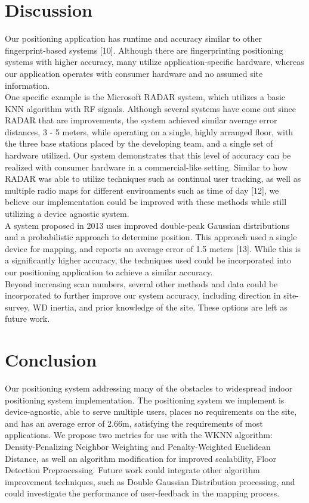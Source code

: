\documentclass[conference]{IEEEtran}
\begin{document}
\section{Discussion}
\indent Our positioning application has runtime and accuracy similar to other fingerprint-based systems [10]. Although there are fingerprinting positioning systems with higher accuracy, many utilize application-specific hardware, whereas our application operates with  consumer hardware and no assumed site information.\\
\indent One specific example is the Microsoft RADAR system, which utilizes a basic KNN algorithm with RF signals. Although several systems have come out since RADAR that are improvements, the system achieved similar average error distances, 3 - 5 meters, while operating on a single, highly arranged floor, with the three base stations placed by the developing team, and a single set of hardware utilized. Our system demonstrates that this level of accuracy can be realized with consumer hardware in a commercial-like setting. Similar to how RADAR was able to utilize techniques such as continual user tracking, as well as multiple radio maps for different environments such as time of day [12], we believe our implementation could be improved with these methods while still utilizing a device agnostic system.\\
\indent A system proposed in 2013 uses improved double-peak Gaussian distributions and a probabilistic approach to determine position. This approach used a single device for mapping, and reports an average error of 1.5 meters [13]. While this is a significantly higher accuracy, the techniques used could be incorporated into our positioning application to achieve a similar accuracy.\\ 
\indent Beyond increasing scan numbers, several other methods and data could be incorporated to further improve our system accuracy, including direction in site-survey, WD inertia, and prior knowledge of the site. These options are left as future work.



\section{Conclusion}
Our positioning system addressing many of the obstacles to widespread indoor positioning system implementation. The positioning system we implement is device-agnostic, able to serve multiple users, places no requirements on the site, and has an average error of 2.66m, satisfying the requirements of most applications. We propose two metrics for use with the WKNN algorithm: Density-Penalizing Neighbor Weighting and Penalty-Weighted Euclidean Distance, as well an algorithm modification for improved scalability, Floor Detection Preprocessing. Future work could integrate other algorithm improvement techniques, such as Double Gaussian Distribution processing, and could investigate the performance of user-feedback in the mapping process.
\end{document}
